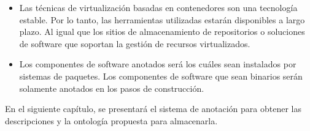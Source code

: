 \begin{itemize}
	\item Las técnicas de virtualización basadas en contenedores son una tecnología estable. Por lo tanto, las herramientas utilizadas estarán disponibles a largo plazo. Al igual que los sitios de almacenamiento de repositorios o soluciones de software que soportan la gestión de recursos virtualizados.
	\item Los componentes de software anotados será los cuáles sean instalados por sistemas de paquetes. Los componentes de software que sean binarios serán solamente anotados en los pasos de construcción. 
\end{itemize}

En el siguiente capítulo, se presentará el sistema de anotación para obtener las descripciones y la ontología propuesta para almacenarla.